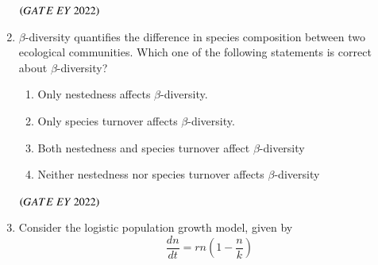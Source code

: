 \documentclass[journal]{IEEEtran}
\numberwithin{equation}{enumi}
\numberwithin{figure}{enumi}
\begin{document}
\begin{enumerate}
\begin{figure}[H]
    \caption{}
    \label{fig:14}
   \end{figure}
    \hfill{$\brak{ GATE\ EY\ 2022}$}
    \bigskip
 \item $\beta$-diversity quantifies the difference in species composition between two ecological
communities. Which one of the following statements is correct about $\beta$-diversity?
    \begin{enumerate}
        \item  Only nestedness affects $\beta$-diversity.
        \item  Only species turnover affects $\beta$-diversity.
        \item  Both nestedness and species turnover affect $\beta$-diversity
        \item  Neither nestedness nor species turnover affects $\beta$-diversity
    \end{enumerate}
    \hfill{$\brak{ GATE\ EY\ 2022}$}
    \bigskip
 \item Consider the logistic population growth model, given by
\[
\frac{dn}{dt} = r n \left( 1 - \frac{n}{k} \right)
\]


\end{enumerate}
\end{document}
